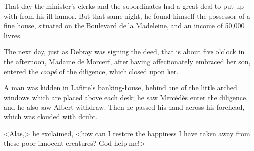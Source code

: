  That day the minister's clerks and the subordinates had a great deal to put up with from his ill-humor. But that same night, he found himself the possessor of a fine house, situated on the Boulevard de la Madeleine, and an income of 50,000 livres. 

 The next day, just as Debray was signing the deed, that is about five o'clock in the afternoon, Madame de Morcerf, after having affectionately embraced her son, entered the \textit{coupé} of the diligence, which closed upon her. 

 A man was hidden in Lafitte's banking-house, behind one of the little arched windows which are placed above each desk; he saw Mercédès enter the diligence, and he also saw Albert withdraw. Then he passed his hand across his forehead, which was clouded with doubt. 

 <Alas,> he exclaimed, <how can I restore the happiness I have taken away from these poor innocent creatures? God help me!> 